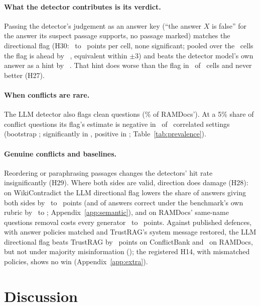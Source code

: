 \paragraph{What the detector contributes is its verdict.} Passing the detector's judgement as an answer key (``the
answer $X$ is false'' for the answer its suspect passage supports, no passage marked) matches the directional flag
(H30: \hThirtyAMin\ to \hThirtyAMax\ points per cell, none significant; pooled over the \PoolThirtyAK\ cells the flag
is ahead by \PoolThirtyA\ \PoolThirtyACI, equivalent within $\pm$3) and beats the detector model's own answer as a
hint by \PoolThirtyB\ \PoolThirtyBCI. That hint does worse than the flag in \nHTwentySevenAPos\ of
\nHTwentySevenATests\ cells and never better (H27).

\paragraph{When conflicts are rare.} The LLM detector also flags clean questions (\cleanFprLlm\% of RAMDocs'). At
a 5\% share of conflict questions its flag's estimate is negative in \prevNegFive\ of \prevN\ correlated settings
(bootstrap \prevNegFiveCI; significantly in \prevSigNeg, positive in \prevSigPos; Table~\ref{tab:prevalence}).

\paragraph{Genuine conflicts and baselines.} Reordering \citep{liu2024lost} or paraphrasing passages changes the
detectors' hit rate insignificantly (H29). Where both sides are valid, direction does damage (H28): on WikiContradict the LLM directional
flag lowers the share of answers giving both sides by \ahTwentyEightWcMiniDir\ to \ahTwentyEightWcLunaDir\ points
(and of answers correct under the benchmark's own rubric by \awikiOrigMiniEffPt\ to \awikiOrigLunaEffPt;
Appendix~\ref{app:semantic}), and on RAMDocs' same-name questions removal costs every generator
\ahTwentyEightAmbMiniRem\ to \ahTwentyEightAmbLunaRem\ points. Against published defences, with answer policies matched and TrustRAG's
system message restored, the LLM directional flag beats TrustRAG by \blHFourteenCbs\ points on ConflictBank and
\blHFourteenRd\ on RAMDocs, but not under majority misinformation (\blHFourteenMj); the registered H14, with
mismatched policies, shows no win (Appendix~\ref{app:extra}).
\section{Discussion}
\label{sec:discussion}


